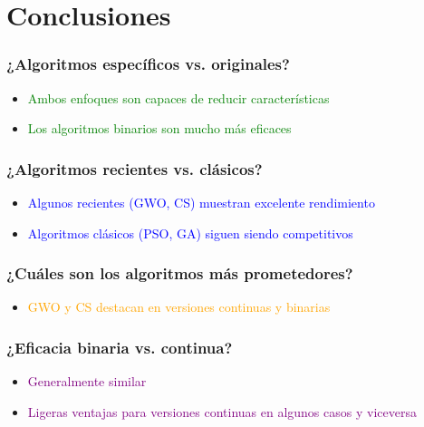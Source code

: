 \section{Conclusiones}

\begin{frame}
\frametitle{¿Algoritmos específicos vs. originales?}
\begin{itemize}
\item<1-> \textcolor{green}{Ambos enfoques son capaces de reducir características}
\item<2-> \textcolor{green}{Los algoritmos binarios son mucho más eficaces}
\end{itemize}
\end{frame}

\begin{frame}
\frametitle{¿Algoritmos recientes vs. clásicos?}
\begin{itemize}
\item<1-> \textcolor{blue}{Algunos recientes (GWO, CS) muestran excelente rendimiento}
\item<2-> \textcolor{blue}{Algoritmos clásicos (PSO, GA) siguen siendo competitivos}
\end{itemize}
\end{frame}

\begin{frame}
\frametitle{¿Cuáles son los algoritmos más prometedores?}
\begin{itemize}
\item<1-> \textcolor{orange}{GWO y CS destacan en versiones continuas y binarias}
\end{itemize}
\end{frame}

\begin{frame}
\frametitle{¿Eficacia binaria vs. continua?}
\begin{itemize}
\item<1-> \textcolor{purple}{Generalmente similar}
\item<2-> \textcolor{purple}{Ligeras ventajas para versiones continuas en algunos casos y viceversa}
\end{itemize}
\end{frame}


